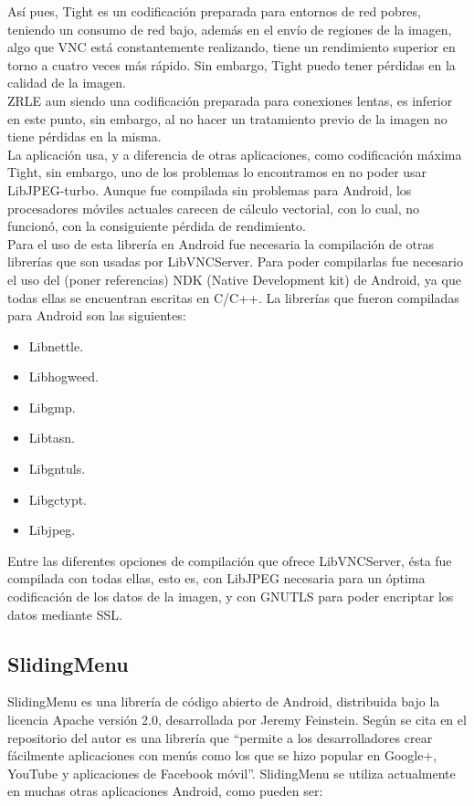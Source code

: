 Así pues, Tight es un codificación preparada para entornos de red pobres, teniendo un consumo de red bajo, además en el envío de regiones de la imagen, algo que VNC está constantemente realizando, tiene un rendimiento superior en torno a cuatro veces más rápido. Sin embargo, Tight puedo tener pérdidas en la calidad de la imagen.\\

ZRLE aun siendo una codificación preparada para conexiones lentas, es inferior en este punto, sin embargo, al no hacer un tratamiento previo de la imagen no tiene pérdidas en la misma.\\

La aplicación usa, y a diferencia de otras aplicaciones, como codificación máxima Tight, sin embargo, uno de los problemas lo encontramos en no poder usar LibJPEG-turbo. Aunque fue compilada sin problemas para Android, los procesadores móviles actuales carecen de cálculo vectorial, con lo cual, no funcionó, con la consiguiente pérdida de rendimiento.\\

Para el uso de esta librería en Android fue necesaria la compilación de otras librerías que son usadas por LibVNCServer. Para poder compilarlas fue necesario el uso del (poner referencias) NDK (Native Development kit) de Android, ya que todas ellas se encuentran escritas en C/C++. La librerías que fueron compiladas para Android son las siguientes:
\begin{itemize}
\item Libnettle.
\item Libhogweed.
\item Libgmp.
\item Libtasn.
\item Libgntuls.
\item Libgctypt.
\item Libjpeg.
\end{itemize}

Entre las diferentes opciones de compilación que ofrece LibVNCServer, ésta fue compilada con todas ellas, esto es, con LibJPEG necesaria para un óptima codificación de los datos de la imagen, y con GNUTLS para poder encriptar los datos mediante SSL.

\subsection{SlidingMenu}

SlidingMenu es una librería de código abierto de Android, distribuida bajo la licencia Apache versión 2.0, desarrollada por Jeremy Feinstein. Según se cita en el repositorio del autor es una librería que “permite a los desarrolladores crear fácilmente aplicaciones con menús como los que se hizo popular en Google+, YouTube y aplicaciones de Facebook móvil”.
SlidingMenu se utiliza actualmente en muchas otras aplicaciones Android, como pueden ser: \\

